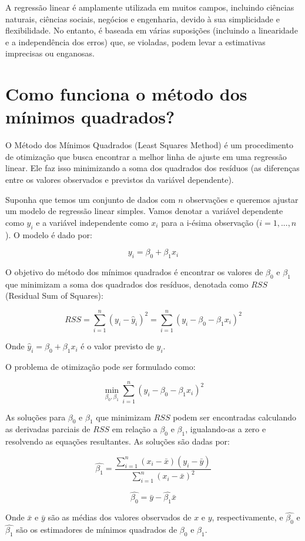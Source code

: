 \documentclass[12pt,a4paper, brazil]{article}
\begin{document}
A regressão linear é amplamente utilizada em muitos campos, incluindo ciências naturais, ciências sociais, negócios e engenharia, devido à sua simplicidade e flexibilidade. No entanto, é baseada em várias suposições (incluindo a linearidade e a independência dos erros) que, se violadas, podem levar a estimativas imprecisas ou enganosas.


\section{Como funciona o método dos mínimos quadrados?}

O Método dos Mínimos Quadrados (Least Squares Method) é um procedimento de otimização que busca encontrar a melhor linha de ajuste em uma regressão linear. Ele faz isso minimizando a soma dos quadrados dos resíduos (as diferenças entre os valores observados e previstos da variável dependente). 

Suponha que temos um conjunto de dados com $n$ observações e queremos ajustar um modelo de regressão linear simples. Vamos denotar a variável dependente como $y_i$ e a variável independente como $x_i$ para a i-ésima observação ($i = 1, ..., n$). O modelo é dado por:

$$y_i = \beta_0 + \beta_1x_i $$

O objetivo do método dos mínimos quadrados é encontrar os valores de $\beta_0$ e $\beta_1$ que minimizam a soma dos quadrados dos resíduos, denotada como $RSS$ (Residual Sum of Squares):

$$RSS = \sum_{i=1}^{n} (y_i - \hat{y}_i)^2 = \sum_{i=1}^{n} (y_i - \beta_0 - \beta_1x_i)^2$$

Onde $\hat{y}_i = \beta_0 + \beta_1x_i$ é o valor previsto de $y_i$.

O problema de otimização pode ser formulado como:

$$\min_{\beta_0, \beta_1} \sum_{i=1}^{n} (y_i - \beta_0 - \beta_1x_i)^2$$

As soluções para $\beta_0$ e $\beta_1$ que minimizam $RSS$ podem ser encontradas calculando as derivadas parciais de $RSS$ em relação a $\beta_0$ e $\beta_1$, igualando-as a zero e resolvendo as equações resultantes. As soluções são dadas por:

$$\hat{\beta_1} = \frac{\sum_{i=1}^{n} (x_i - \bar{x})(y_i - \bar{y})}{\sum_{i=1}^{n} (x_i - \bar{x})^2}$$

$$\hat{\beta_0} = \bar{y} - \hat{\beta_1}\bar{x}$$

Onde $\bar{x}$ e $\bar{y}$ são as médias dos valores observados de $x$ e $y$, respectivamente, e $\hat{\beta_0}$ e $\hat{\beta_1}$ são os estimadores de mínimos quadrados de $\beta_0$ e $\beta_1$.
\end{document}
